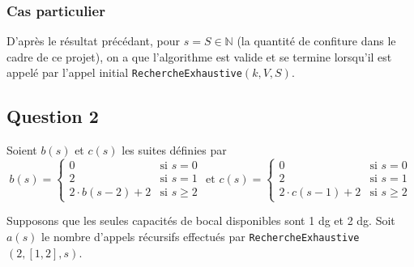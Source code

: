 \documentclass[12pt,a4paper]{article}
\begin{document}
\subsubsection*{Cas particulier}
D'apr\`es le r\'esultat pr\'ec\'edant, pour $s = S \in \mathbb{N}$ (la quantit\'e de confiture dans le cadre de ce projet), on a que l'algorithme est valide et se termine lorsqu'il est appel\'e par l'appel initial \texttt{RechercheExhaustive}$(k,V,S)$. 

\subsection*{Question 2}
Soient $b(s)$ et $c(s)$ les suites d\'efinies par
\begin{equation*}
\left .b(s) = \begin{cases} 
      0 & \text{si } s = 0 \\
      2 & \text{si } s = 1 \\
      2\cdot b(s-2) + 2 & \text{si } s\geq 2 
   \end{cases} \right.
   \text{ et }
\left .c(s) = \begin{cases} 
      0 & \text{si } s = 0 \\
      2 & \text{si } s = 1 \\
      2\cdot c(s-1) + 2 & \text{si } s\geq 2 
   \end{cases} \right.
\end{equation*}

Supposons que les seules capacit\'es de bocal disponibles sont 1 \si{dg} et 2 \si{dg}. Soit $a(s)$ le nombre d'appels r\'ecursifs effectu\'es par \texttt{RechercheExhaustive}$(2,[1,2],s)$.
\end{document}
